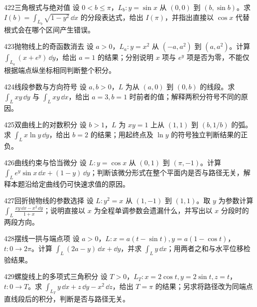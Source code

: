 \begin{exercise}{422}{三角根式与绝对值}
设 $0<b\leq\pi$，$L_b:y=\sin x$ 从 $(0,0)$ 到 $(b,\sin b)$。求 $I(b)=\int_{L_b}\sqrt{1-y^2}\,\dd x$ 的分段表达式，给出 $I(\pi)$，并指出直接以 $\cos x$ 代替根式会在哪个区间产生错误。
\end{exercise}

\begin{exercise}{423}{抛物线上的奇函数消去}
设 $a>0$，$L_a:y=x^2$ 从 $(-a,a^2)$ 到 $(a,a^2)$。计算 $\int_{L_a}(x+e^y)\,\dd y$，给出 $a=1$ 的结果；分别说明 $x$ 项与 $e^y$ 项是否为零，不能仅根据端点纵坐标相同判断整个积分。
\end{exercise}

\begin{exercise}{424}{线段参数与方向符号}
设 $a,b>0$，$L$ 为从 $(a,0)$ 到 $(0,b)$ 的线段。求 $\int_Lxy\,\dd y$ 与 $\int_Lxy\,\dd x$，给出 $a=3,b=1$ 时前者的值；解释两积分符号不同的原因。
\end{exercise}

\begin{exercise}{425}{双曲线上的对数积分}
设 $b>1$，$L$ 为 $xy=1$ 上从 $(1,1)$ 到 $(b,1/b)$ 的弧。求 $\int_Lx\ln y\,\dd y$，给出 $b=2$ 的结果；用起终点及 $\ln y$ 的符号独立判断结果的正负。
\end{exercise}

\begin{exercise}{426}{曲线约束与恰当微分}
设 $L:y=\cos x$ 从 $(0,1)$ 到 $(\pi,-1)$。计算 $\int_Le^y\sin x\,\dd x+(1-y)\,\dd y$；判断该微分形式在整个平面内是否与路径无关，解释本题沿给定曲线仍可快速求值的原因。
\end{exercise}

\begin{exercise}{427}{回折抛物线的参数选择}
设 $L:y^2=x$ 从 $(1,-1)$ 到 $(1,1)$。取 $y$ 为参数计算 $\int_L\frac{xy\,\dd x-x^2\,\dd y}{1+x}$；说明直接以 $x$ 为全程单调参数会遗漏什么，并写出以 $x$ 分段时的两段方向。
\end{exercise}

\begin{exercise}{428}{摆线一拱与端点项}
设 $a>0$，$L:x=a(t-\sin t),y=a(1-\cos t)$，$t:0\to2\pi$。计算 $\int_L(2a-y)\,\dd x+\dd y$，并求 $\int_Ly\,\dd x$；用两者之和与水平位移检验结果。
\end{exercise}

\begin{exercise}{429}{螺旋线上的多项式三角积分}
设 $T>0$，$L_T:x=2\cos t,y=2\sin t,z=t$，$t:0\to T$。求 $\int_{L_T}y\,\dd x+z\,\dd y-x^2\,\dd z$，给出 $T=\pi$ 的结果；另求将路径改为同端点直线段后的积分，判断是否与路径无关。
\end{exercise}

